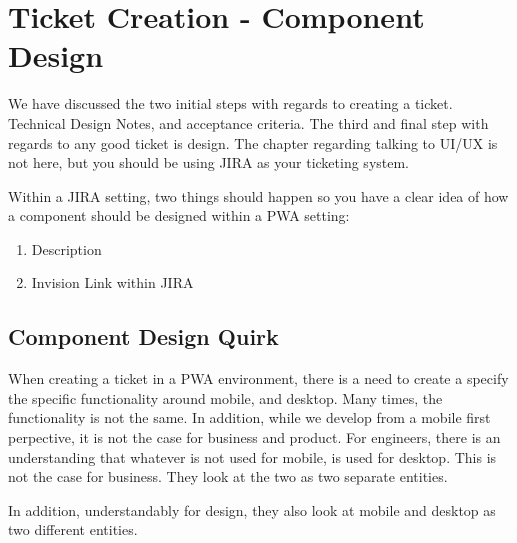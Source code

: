 \maketitle{}
\section{ Ticket Creation - Component Design }
We have discussed the two initial steps with regards to creating a ticket.
Technical Design Notes, and acceptance criteria. The third and final step
with regards to any good ticket is design. The chapter regarding talking to
UI/UX is not here, but you should be using JIRA as your ticketing system.

Within a JIRA setting, two things should happen so you have a clear idea of
how a component should be designed within a PWA setting:

\begin{enumerate}
  \item Description
  \item Invision Link within JIRA
\end{enumerate}

\subsection{ Component Design Quirk }
When creating a ticket in a PWA environment, there is a need to create a specify
the specific functionality around mobile, and desktop. Many times, the
functionality is not the same. In addition, while we develop from a mobile first
perpective, it is not the case for business and product. For engineers, there
is an understanding that whatever is not used for mobile, is used for desktop.
This is not the case for business. They look at the two as two separate
entities.

In addition, understandably for design, they also look at mobile and desktop as
two different entities.
